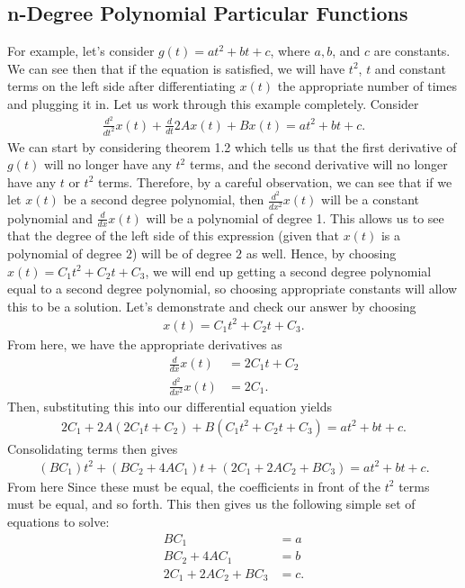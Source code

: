 \subsection{n-Degree Polynomial Particular Functions}
For example, let's consider $g(t)=at^2+bt+c$, where $a,b$, and $c$ are constants. We can see then that if the equation is satisfied, we will have $t^2$, $t$ and constant terms on the left side after differentiating $x(t)$ the appropriate number of times and plugging it in. Let us work through this example completely. Consider
\begin{align}
\frac{d^2}{dt^2}x(t)+\frac{d}{dt}2Ax(t)+Bx(t)=at^2+bt+c.
\end{align}
We can start by considering theorem 1.2 which tells us that the first derivative of $g(t)$ will no longer have any $t^2$ terms, and the second derivative will no longer have any $t$ or $t^2$ terms. Therefore, by a careful observation, we can see that if we let $x(t)$ be a second degree polynomial, then $\frac{d^2}{dx^2}x(t)$ will be a constant polynomial and $\frac{d}{dx}x(t)$ will be a polynomial of degree 1. This allows us to see that the degree of the left side of this expression (given that $x(t)$ is a polynomial of degree $2$) will be of degree $2$ as well. Hence, by choosing $x(t)=C_1t^2+C_2t+C_3$, we will end up getting a second degree polynomial equal to a second degree polynomial, so choosing appropriate constants will allow this to be a solution. Let's demonstrate and check our answer by choosing
\begin{align}
x(t)=C_1t^2+C_2t+C_3.
\end{align}
From here, we have the appropriate derivatives as
\begin{align}
\frac{d}{dx}x(t) &=2C_1t+C_2 \\
\frac{d^2}{dx^2}x(t) &=2C_1.
\end{align}
Then, substituting this into our differential equation yields
\begin{align}
2C_1+2A(2C_1t+C_2)+B(C_1t^2+C_2t+C_3)=at^2+bt+c.
\end{align}
Consolidating terms then gives
\begin{align}
(BC_1)t^2+(BC_2+4AC_1)t+(2C_1+2AC_2+BC_3)=at^2+bt+c.
\end{align}
From here Since these must be equal, the coefficients in front of the $t^2$ terms must be equal, and so forth. This then gives us the following simple set of equations to solve:
\begin{align}
BC_1 &=a \\
BC_2+4AC_1 &= b \\
2C_1+2AC_2+BC_3 &= c.
\end{align}
